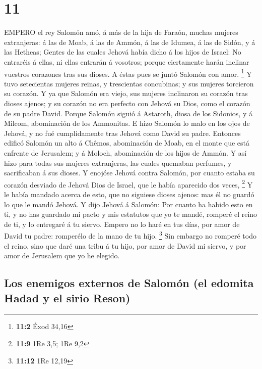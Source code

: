 \hypertarget{section-10}{%
\section{11}\label{section-10}}

 EMPERO el rey Salomón amó, á más de la hija de Faraón,
muchas mujeres extranjeras: á las de Moab, á las de Ammón, á las de
Idumea, á las de Sidón, y á las Hetheas;  Gentes de las
cuales Jehová había dicho á los hijos de Israel: No entraréis á ellas,
ni ellas entrarán á vosotros; porque ciertamente harán inclinar vuestros
corazones tras sus dioses. A éstas pues se juntó Salomón con amor.
\footnote{\textbf{11:2} Éxod 34,16}  Y tuvo setecientas
mujeres reinas, y trescientas concubinas; y sus mujeres torcieron su
corazón.  Y ya que Salomón era viejo, sus mujeres inclinaron
su corazón tras dioses ajenos; y su corazón no era perfecto con Jehová
su Dios, como el corazón de su padre David.  Porque Salomón
siguió á Astaroth, diosa de los Sidonios, y á Milcom, abominación de los
Ammonitas.  E hizo Salomón lo malo en los ojos de Jehová, y
no fué cumplidamente tras Jehová como David su padre. 
Entonces edificó Salomón un alto á Chêmos, abominación de Moab, en el
monte que está enfrente de Jerusalem; y á Moloch, abominación de los
hijos de Ammón.  Y así hizo para todas sus mujeres
extranjeras, las cuales quemaban perfumes, y sacrificaban á sus dioses.
 Y enojóse Jehová contra Salomón, por cuanto estaba su
corazón desviado de Jehová Dios de Israel, que le había aparecido dos
veces, \footnote{\textbf{11:9} 1Re 3,5; 1Re 9,2}  Y le
había mandado acerca de esto, que no siguiese dioses ajenos: mas él no
guardó lo que le mandó Jehová.  Y dijo Jehová á Salomón:
Por cuanto ha habido esto en ti, y no has guardado mi pacto y mis
estatutos que yo te mandé, romperé el reino de ti, y lo entregaré á tu
siervo.  Empero no lo haré en tus días, por amor de David
tu padre: romperélo de la mano de tu hijo. \footnote{\textbf{11:12} 1Re
  12,19}  Sin embargo no romperé todo el reino, sino que
daré una tribu á tu hijo, por amor de David mi siervo, y por amor de
Jerusalem que yo he elegido.

\hypertarget{los-enemigos-externos-de-salomuxf3n-el-edomita-hadad-y-el-sirio-reson}{%
\subsection{Los enemigos externos de Salomón (el edomita Hadad y el
sirio
Reson)}\label{los-enemigos-externos-de-salomuxf3n-el-edomita-hadad-y-el-sirio-reson}}

